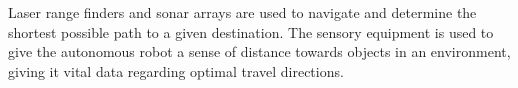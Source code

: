 Laser range finders and sonar arrays are used to navigate and determine the shortest possible path to a given destination. The sensory equipment is used to give the autonomous robot a sense of distance towards objects in an environment, giving it vital data regarding optimal travel directions\cite{lasersonar}.






